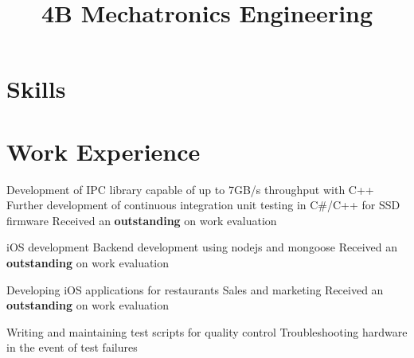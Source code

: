 \documentclass[11pt,a4paper]{moderncv}
\title{4B Mechatronics Engineering}               %
\begin{document}
\maketitle

\vspace{-13mm}

\section{Skills}


\section{Work Experience}
{Development of IPC library capable of up to 7GB/s throughput with C++
    \newline{}Further development of continuous integration unit testing in C\#/C++ for SSD firmware
\newline{}Received an \textbf{outstanding} on work evaluation}

{iOS development
    \newline{}Backend development using nodejs and mongoose
\newline{}Received an \textbf{outstanding} on work evaluation}

{Developing iOS applications for restaurants
\newline{} Sales and marketing 
\newline{}Received an \textbf{outstanding} on work evaluation}

{Writing and maintaining test scripts for quality control
    \newline{}Troubleshooting hardware in the event of test failures}
\end{document}
